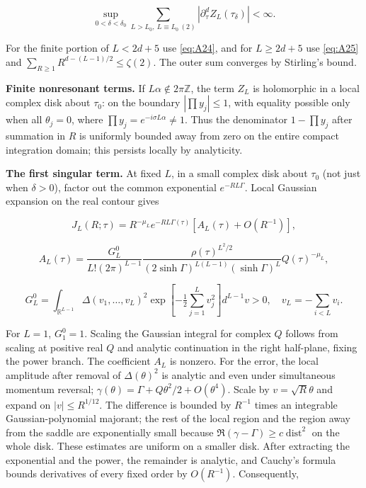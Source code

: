 \documentclass[11pt,a4paper]{article}
\numberwithin{equation}{section}
\theoremstyle{plain}
\theoremstyle{definition}
\begin{document}
\begin{equation}
\boxed{\sup_{0<\delta<\delta_0}\sum_{L>L_0,\ L\equiv L_0\ (2)}|\partial_\tau^d Z_L(\tau_\delta)|<\infty.}
\label{eq:A26}
\end{equation}

For the finite portion of \(L<2d+5\) use \eqref{eq:A24}, and for \(L\ge2d+5\) use \eqref{eq:A25} and \(\sum_{R\ge1}R^{d-(L-1)/2}\le\zeta(2)\). The outer sum converges by Stirling's bound.

\textbf{Finite nonresonant terms.} If \(L\alpha\notin2\pi\mathbb Z\), the term \(Z_L\) is holomorphic in a local complex disk about \(\tau_0\): on the boundary \(|\prod y_j|\le1\), with equality possible only when all \(\theta_j=0\), where \(\prod y_j=e^{-i\sigma L\alpha}\ne1\). Thus the denominator \(1-\prod y_j\) after summation in \(R\) is uniformly bounded away from zero on the entire compact integration domain; this persists locally by analyticity.

\textbf{The first singular term.} At fixed \(L\), in a small complex disk about \(\tau_0\) (not just when \(\delta>0\)), factor out the common exponential \(e^{-RL\Gamma}\). Local Gaussian expansion on the real contour gives

\begin{equation}
J_L(R;\tau)=R^{-\mu_L}e^{-RL\Gamma(\tau)}[A_L(\tau)+O(R^{-1})],
\label{eq:A27}
\end{equation}

\[A_L(\tau)=\frac{G_L^0}{L!(2\pi)^{L-1}}\frac{\rho(\tau)^{L^2/2}}{(2\sinh\Gamma)^{L(L-1)}(\sinh\Gamma)^L}Q(\tau)^{-\mu_L},\]

\[G_L^0=\int_{\mathbb R^{L-1}}\Delta(v_1,\ldots,v_L)^2\exp[-\tfrac12\sum_{j=1}^L v_j^2]d^{L-1}v>0,\quad v_L=-\sum_{i<L}v_i.\]

For \(L=1\), \(G_1^0=1\). Scaling the Gaussian integral for complex \(Q\) follows from scaling at positive real \(Q\) and analytic continuation in the right half-plane, fixing the power branch. The coefficient \(A_L\) is nonzero. For the error, the local amplitude after removal of \(\Delta(\theta)^2\) is analytic and even under simultaneous momentum reversal; \(\gamma(\theta)=\Gamma+Q\theta^2/2+O(\theta^4)\). Scale by \(v=\sqrt R\theta\) and expand on \(|v|\le R^{1/12}\). The difference is bounded by \(R^{-1}\) times an integrable Gaussian-polynomial majorant; the rest of the local region and the region away from the saddle are exponentially small because \(\Re(\gamma-\Gamma)\ge c\operatorname{dist}^2\) on the whole disk. These estimates are uniform on a smaller disk. After extracting the exponential and the power, the remainder is analytic, and Cauchy's formula bounds derivatives of every fixed order by \(O(R^{-1})\). Consequently,
\end{document}
